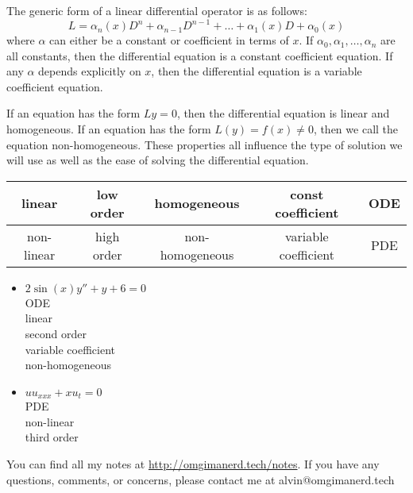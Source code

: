 \documentclass{math}
\begin{document}
The generic form of a linear differential operator is as follows:
\[ L = \alpha_n(x)D^n+\alpha_{n-1}D^{n-1}+\dots+\alpha_1(x)D+\alpha_0(x) \]
where \( \alpha \) can either be a constant or coefficient in terms of \( x \).
If \( \alpha_0,\alpha_1,\dots,\alpha_n \) are all constants, then the
differential equation is a constant coefficient equation. If any \( \alpha \)
depends explicitly on \( x \), then the differential equation is a variable
coefficient equation. \par
If an equation has the form \( Ly = 0 \), then the differential equation is
linear and homogeneous. If an equation has the form \( L(y) = f(x) \ne 0 \),
then we call the equation non-homogeneous. These properties all influence the
type of solution we will use as well as the ease of solving the differential
equation.
\begin{center}
  \begin{tabular}{|c|c|c|c|c|}
    \hline
    linear & low order & homogeneous & const coefficient & ODE \\
    \hline
    non-linear & high order & non-homogeneous & variable coefficient & PDE \\
    \hline
  \end{tabular}
\end{center}
\begin{itemize}
  \item \( 2\sin(x)y''+y+6 = 0 \) \\
    ODE \\
    linear \\
    second order \\
    variable coefficient \\
    non-homogeneous
  \item \( uu_{xxx}+xu_t = 0 \) \\
    PDE \\
    non-linear \\
    third order
\end{itemize}

\begin{center}
  You can find all my notes at \url{http://omgimanerd.tech/notes}. If you have
  any questions, comments, or concerns, please contact me at
  alvin@omgimanerd.tech
\end{center}
\end{document}
